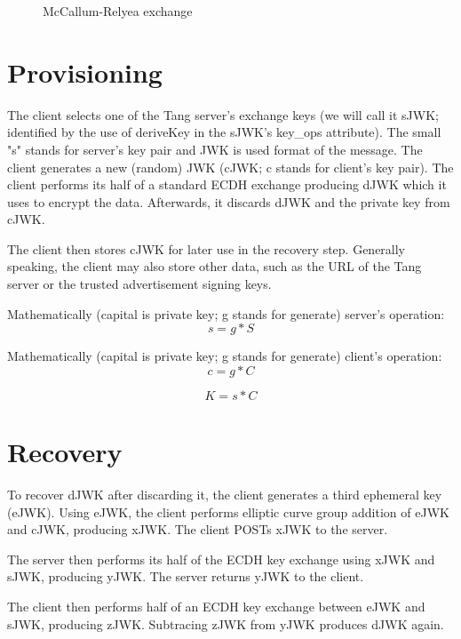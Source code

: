 \documentclass[../xdudla00-porting-Tang-to-Open-WRT.tex]{subfiles}
\begin{document}
\begin{figure}[h]
    \centering
    \caption{McCallum-Relyea exchange}
    \label{fig:mrexchange}
\end{figure}

\section{Provisioning}
The client selects one of the Tang server's exchange keys (we will call it sJWK; identified by the use of deriveKey in the sJWK's key\_ops attribute).
The small "s" stands for server's key pair and JWK\cite{JWK} is used format of the message.
The client generates a new (random) JWK (cJWK; c stands for client's key pair).
The client performs its half of a standard ECDH exchange producing dJWK which it uses to encrypt the data.
Afterwards, it discards dJWK and the private key from cJWK.

The client then stores cJWK for later use in the recovery step.
Generally speaking, the client may also store other data, such as the URL \cite{url} of the Tang server or the trusted advertisement signing keys.

Mathematically (capital is private key; g stands for generate) server's operation:
\begin{equation}
    s = g * S
\end{equation}

Mathematically (capital is private key; g stands for generate) client's operation:
\begin{equation}
    c = g * C
\end{equation}

\begin{equation}
    K = s * C
\end{equation}

\section{Recovery}
To recover dJWK after discarding it, the client generates a third ephemeral key (eJWK).
Using eJWK, the client performs elliptic curve group addition of eJWK and cJWK, producing xJWK. The client POSTs xJWK to the server.

The server then performs its half of the ECDH key exchange using xJWK and sJWK, producing yJWK. The server returns yJWK to the client.

The client then performs half of an ECDH key exchange between eJWK and sJWK, producing zJWK. Subtracing zJWK from yJWK produces dJWK again.
\end{document}
